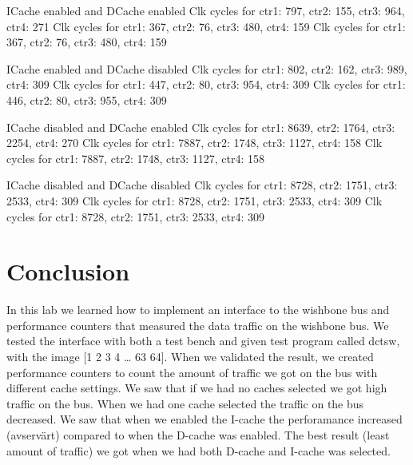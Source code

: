 \documentclass[a4paper]{article}
\begin{document}
ICache enabled and DCache enabled \newline
Clk cycles for ctr1: 797, ctr2: 155, ctr3: 964, ctr4: 271  \newline
Clk cycles for ctr1: 367, ctr2:  76, ctr3: 480, ctr4: 159 \newline
Clk cycles for ctr1: 367, ctr2:  76, ctr3: 480, ctr4: 159 \newline  \newline

ICache enabled and DCache disabled  \newline
Clk cycles for ctr1: 802, ctr2: 162, ctr3: 989, ctr4: 309  \newline
Clk cycles for ctr1: 447, ctr2:  80, ctr3: 954, ctr4: 309  \newline
Clk cycles for ctr1: 446, ctr2:  80, ctr3: 955, ctr4: 309  \newline  \newline

ICache disabled and DCache enabled \newline
Clk cycles for ctr1: 8639, ctr2: 1764, ctr3: 2254, ctr4: 270 \newline
Clk cycles for ctr1: 7887, ctr2: 1748, ctr3: 1127, ctr4: 158 \newline
Clk cycles for ctr1: 7887, ctr2: 1748, ctr3: 1127, ctr4: 158 \newline \newline

ICache disabled and DCache disabled \newline
Clk cycles for ctr1: 8728, ctr2: 1751, ctr3: 2533, ctr4: 309 \newline
Clk cycles for ctr1: 8728, ctr2: 1751, ctr3: 2533, ctr4: 309 \newline
Clk cycles for ctr1: 8728, ctr2: 1751, ctr3: 2533, ctr4: 309 \newline

\section{Conclusion}

In this lab we learned how to implement an interface to the wishbone bus
and performance counters that measured the data traffic on the wishbone
bus.  We tested the interface with both a test bench and given test
program called dctsw, with the image [1 2 3 4 … 63 64]. When we
validated the result, we created performance counters to count the
amount of traffic we got on the bus with different cache settings. We
saw that if we had no caches selected we got high traffic on the bus.
When we had one cache selected the traffic on the bus decreased. We saw
that when we enabled the I-cache the perforamance increased (avservärt)
compared to when the D-cache was enabled. The best result (least amount
of traffic) we got when we had both D-cache and I-cache was selected.
\end{document}
